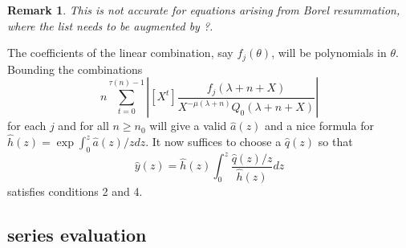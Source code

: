 \documentclass[10pt]{article}
\numberwithin{equation}{section}
\newtheorem{remark}[theorem]{Remark}
\begin{document}
\begin{remark}
This is not accurate for equations arising from Borel resummation, where the list needs to be augmented by ?.
\end{remark}

The coefficients of the linear combination, say $f_j(\theta)$, will be polynomials in $\theta$. Bounding the combinations
\begin{equation*}
n \sum_{t=0}^{\tau(n) - 1} \left| [X^t] \frac{f_j(\lambda+n+X)}{X^{-\mu(\lambda+n)} Q_0(\lambda+n+X)} \right|
\end{equation*}
for each $j$ and for all $n \ge n_0$ will give a valid $\hat{a}(z)$ and a nice formula for $\hat{h}(z) = \exp \int_0^z \hat{a}(z)/z dz$. It now suffices to choose a $\hat{q}(z)$ so that
\begin{equation*}
\hat{y}(z)=\hat{h}(z) \int_0^z \frac{\hat{q}(z)/z}{\hat{h}(z)}{dz}
\end{equation*}
satisfies conditions 2 and 4.

\subsection{series evaluation}
\end{document}
